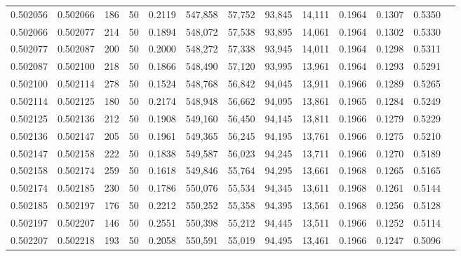 \begin{tabular}{rrrrrrrrrrrrr}
0.502056 & 0.502066 & 186 &  50 &                                     0.2119 & 547,858 &  57,752 &  93,845 &  14,111 & 0.1964 & 0.1307 & 0.5350 \\
0.502066 & 0.502077 & 214 &  50 &                                     0.1894 & 548,072 &  57,538 &  93,895 &  14,061 & 0.1964 & 0.1302 & 0.5330 \\
0.502077 & 0.502087 & 200 &  50 &                                     0.2000 & 548,272 &  57,338 &  93,945 &  14,011 & 0.1964 & 0.1298 & 0.5311 \\
0.502087 & 0.502100 & 218 &  50 &                                     0.1866 & 548,490 &  57,120 &  93,995 &  13,961 & 0.1964 & 0.1293 & 0.5291 \\
0.502100 & 0.502114 & 278 &  50 &                                     0.1524 & 548,768 &  56,842 &  94,045 &  13,911 & 0.1966 & 0.1289 & 0.5265 \\
0.502114 & 0.502125 & 180 &  50 &                                     0.2174 & 548,948 &  56,662 &  94,095 &  13,861 & 0.1965 & 0.1284 & 0.5249 \\
0.502125 & 0.502136 & 212 &  50 &                                     0.1908 & 549,160 &  56,450 &  94,145 &  13,811 & 0.1966 & 0.1279 & 0.5229 \\
0.502136 & 0.502147 & 205 &  50 &                                     0.1961 & 549,365 &  56,245 &  94,195 &  13,761 & 0.1966 & 0.1275 & 0.5210 \\
0.502147 & 0.502158 & 222 &  50 &                                     0.1838 & 549,587 &  56,023 &  94,245 &  13,711 & 0.1966 & 0.1270 & 0.5189 \\
0.502158 & 0.502174 & 259 &  50 &                                     0.1618 & 549,846 &  55,764 &  94,295 &  13,661 & 0.1968 & 0.1265 & 0.5165 \\
0.502174 & 0.502185 & 230 &  50 &                                     0.1786 & 550,076 &  55,534 &  94,345 &  13,611 & 0.1968 & 0.1261 & 0.5144 \\
0.502185 & 0.502197 & 176 &  50 &                                     0.2212 & 550,252 &  55,358 &  94,395 &  13,561 & 0.1968 & 0.1256 & 0.5128 \\
0.502197 & 0.502207 & 146 &  50 &                                     0.2551 & 550,398 &  55,212 &  94,445 &  13,511 & 0.1966 & 0.1252 & 0.5114 \\
0.502207 & 0.502218 & 193 &  50 &                                     0.2058 & 550,591 &  55,019 &  94,495 &  13,461 & 0.1966 & 0.1247 & 0.5096 \\

\end{tabular}
